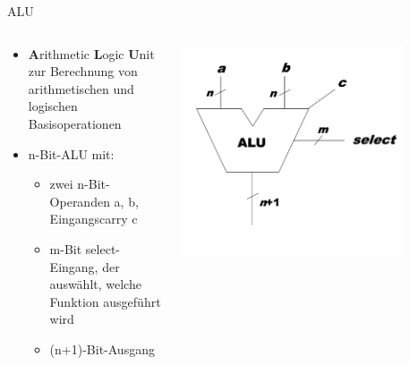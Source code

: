 \documentclass[
  german,            %
  aspectratio=169,    %
]{tumbeamer}
\begin{document}
\begin{frame}[c]{ALU}{}
	\begin{columns}[c]
		\begin{column}{0.5\textwidth}
			\begin{itemize}
				\item \textbf{A}rithmetic \textbf{L}ogic \textbf{U}nit zur Berechnung von arithmetischen und logischen Basisoperationen
				\item n-Bit-ALU mit:
				 \begin{itemize}
          \item zwei n-Bit-Operanden a, b, Eingangscarry c
          \item m-Bit select-Eingang, der auswählt, welche Funktion ausgeführt wird
          \item (n+1)-Bit-Ausgang
         \end{itemize}
			\end{itemize}
		
		\end{column}
		\begin{column}{0.5\textwidth}
			\begin{center}
				\includegraphics[width=0.8\textwidth]{w07_alu_schaltzeichen.png}
			\end{center}
		\end{column}
	\end{columns}
\end{frame}
\end{document}
